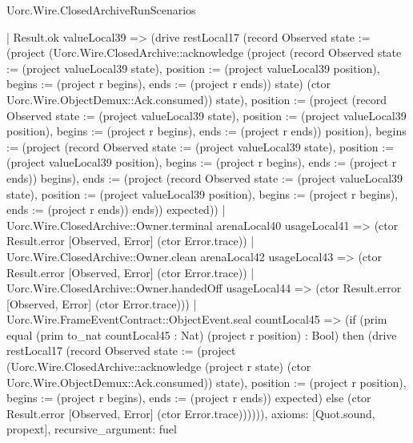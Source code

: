 \begin{lexlean}{Uorc.Wire.ClosedArchiveRunScenarios}
\begin{semanticmodule}
{            | Result.ok valueLocal39 => (drive restLocal17 (record Observed {state := (project (Uorc.Wire.ClosedArchive::acknowledge (project (record Observed {state := (project valueLocal39 state), position := (project valueLocal39 position), begins := (project r begins), ends := (project r ends)}) state) (ctor Uorc.Wire.ObjectDemux::Ack.consumed)) state), position := (project (record Observed {state := (project valueLocal39 state), position := (project valueLocal39 position), begins := (project r begins), ends := (project r ends)}) position), begins := (project (record Observed {state := (project valueLocal39 state), position := (project valueLocal39 position), begins := (project r begins), ends := (project r ends)}) begins), ends := (project (record Observed {state := (project valueLocal39 state), position := (project valueLocal39 position), begins := (project r begins), ends := (project r ends)}) ends)}) expected))
          | Uorc.Wire.ClosedArchive::Owner.terminal arenaLocal40 usageLocal41 => (ctor Result.error [Observed, Error] (ctor Error.trace))
          | Uorc.Wire.ClosedArchive::Owner.clean arenaLocal42 usageLocal43 => (ctor Result.error [Observed, Error] (ctor Error.trace))
          | Uorc.Wire.ClosedArchive::Owner.handedOff usageLocal44 => (ctor Result.error [Observed, Error] (ctor Error.trace)))
        | Uorc.Wire.FrameEventContract::ObjectEvent.seal countLocal45 => (if (prim equal (prim to_nat countLocal45 : Nat) (project r position) : Bool) then (drive restLocal17 (record Observed {state := (project (Uorc.Wire.ClosedArchive::acknowledge (project r state) (ctor Uorc.Wire.ObjectDemux::Ack.consumed)) state), position := (project r position), begins := (project r begins), ends := (project r ends)}) expected) else (ctor Result.error [Observed, Error] (ctor Error.trace)))))),
  axioms: [Quot.sound, propext],
  recursive_argument: fuel
}


\end{semanticmodule}
\end{lexlean}
